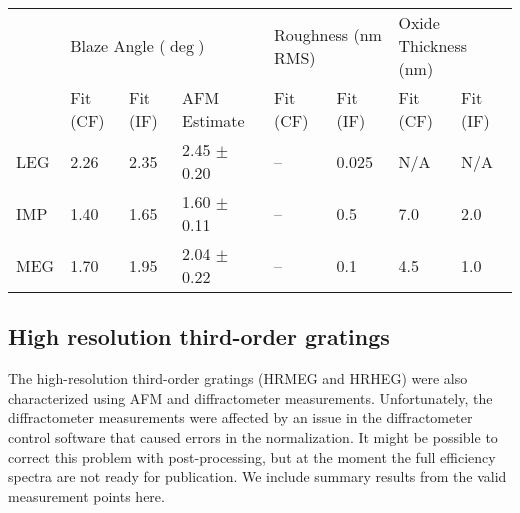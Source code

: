 \begin{table}[htbp]
   \centering
   \begin{tabular}{@{} llllllll @{}} %
      \toprule
    &  \multicolumn{3}{l}{Blaze Angle ($\deg$)} & \multicolumn{2}{l}{Roughness (nm RMS)} &  \multicolumn{2}{l}{Oxide Thickness (nm)} \\
      \cmidrule(lr){2-4}    \cmidrule(lr){5-6}    \cmidrule(lr){7-8}  
 &	Fit (CF) & Fit (IF) & AFM Estimate & Fit (CF) & Fit (IF) &  Fit (CF) & Fit (IF)\\
 \cmidrule(lr){2-2}   \cmidrule(lr){3-3} \cmidrule(lr){4-4} \cmidrule(lr){5-5} \cmidrule(lr){6-6}  \cmidrule(lr){7-7}  \cmidrule(lr){8-8}
LEG & 2.26 & 2.35 & 2.45 $\pm$ 0.20 & -- & 0.025 & N/A & N/A \\
IMP & 1.40 & 1.65 & 1.60 $\pm$ 0.11 & -- & 0.5 & 7.0 & 2.0 \\
MEG & 1.70 & 1.95 & 2.04  $\pm$ 0.22 & -- & 0.1 & 4.5 & 1.0\\
      \bottomrule
   \end{tabular}
   \label{fittingResultsTable}
\end{table}

\subsection{High resolution third-order gratings}
The high-resolution third-order gratings (HRMEG and HRHEG) were also characterized using AFM and diffractometer measurements.  Unfortunately, the diffractometer measurements were affected by an issue in the diffractometer control software that caused errors in the normalization.  It might be possible to correct this problem with post-processing, but at the moment the full efficiency spectra are not ready for publication.  We include summary results from the valid measurement points here.

